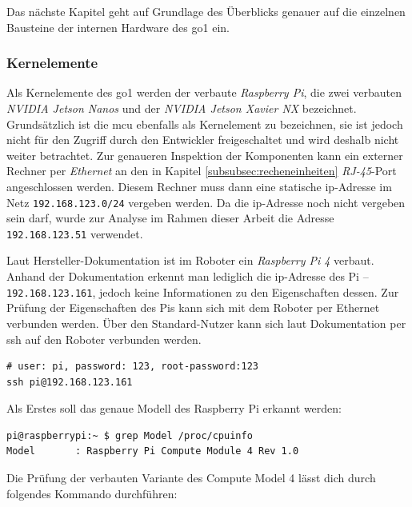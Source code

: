 Das nächste Kapitel geht auf Grundlage des Überblicks genauer auf die einzelnen Bausteine der internen Hardware des \gls{go1}
ein.

\subsubsection{Kernelemente}
\label{subsubsec:kernelemente}

Als Kernelemente des \gls{go1} werden der verbaute \emph{Raspberry Pi}, die zwei verbauten \emph{NVIDIA Jetson Nanos} und
der \emph{NVIDIA Jetson Xavier NX} bezeichnet.
Grundsätzlich ist die \gls{mcu} ebenfalls als Kernelement zu bezeichnen, sie ist jedoch nicht für den Zugriff durch den
Entwickler freigeschaltet und wird deshalb nicht weiter betrachtet.
Zur genaueren Inspektion der Komponenten kann ein externer Rechner per \emph{Ethernet} an den in Kapitel \ref{subsubsec:recheneinheiten}
\emph{RJ-45}-Port angeschlossen werden.
Diesem Rechner muss dann eine statische \gls{ip}-Adresse im Netz \texttt{192.168.123.0/24} vergeben werden.
Da die \gls{ip}-Adresse noch nicht vergeben sein darf, wurde zur Analyse im Rahmen dieser Arbeit die Adresse \texttt{192.168.123.51}
verwendet.

\label{par:raspi}

Laut Hersteller-Dokumentation ist im Roboter ein \emph{Raspberry Pi \num{4}} verbaut.
Anhand der Dokumentation erkennt man lediglich die \gls{ip}-Adresse des Pi -- \texttt{192.168.123.161}, jedoch keine Informationen
zu den Eigenschaften dessen.
Zur Prüfung der Eigenschaften des Pis kann sich mit dem Roboter per Ethernet verbunden werden.
Über den Standard-Nutzer kann sich laut Dokumentation per \gls{ssh} auf den Roboter verbunden werden.

\begin{lstlisting}[label=lst:pi-ssh]
# user: pi, password: 123, root-password:123
ssh pi@192.168.123.161
\end{lstlisting}

\noindent Als Erstes soll das genaue Modell des Raspberry Pi erkannt werden:

\begin{lstlisting}[label=lst:pi-model]
pi@raspberrypi:~ $ grep Model /proc/cpuinfo
Model		: Raspberry Pi Compute Module 4 Rev 1.0
\end{lstlisting}

\noindent Die Prüfung der verbauten Variante des Compute Model 4 lässt dich durch folgendes Kommando durchführen:

